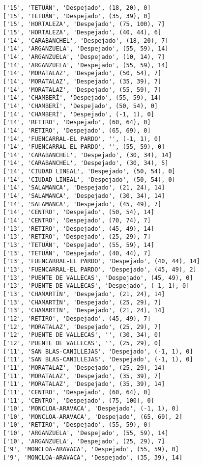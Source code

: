 \documentclass[11pt]{article}
\begin{document}
\begin{Verbatim}[commandchars=\\\{\}]
['15', 'TETUÁN', 'Despejado', (18, 20), 0]
['15', 'TETUÁN', 'Despejado', (35, 39), 0]
['15', 'HORTALEZA', 'Despejado', (75, 100), 7]
['15', 'HORTALEZA', 'Despejado', (40, 44), 6]
['14', 'CARABANCHEL', 'Despejado', (18, 20), 7]
['14', 'ARGANZUELA', 'Despejado', (55, 59), 14]
['14', 'ARGANZUELA', 'Despejado', (10, 14), 7]
['14', 'ARGANZUELA', 'Despejado', (55, 59), 14]
['14', 'MORATALAZ', 'Despejado', (50, 54), 7]
['14', 'MORATALAZ', 'Despejado', (35, 39), 7]
['14', 'MORATALAZ', 'Despejado', (55, 59), 7]
['14', 'CHAMBERÍ', 'Despejado', (55, 59), 14]
['14', 'CHAMBERÍ', 'Despejado', (50, 54), 0]
['14', 'CHAMBERÍ', 'Despejado', (-1, 1), 0]
['14', 'RETIRO', 'Despejado', (60, 64), 0]
['14', 'RETIRO', 'Despejado', (65, 69), 0]
['14', 'FUENCARRAL-EL PARDO', '', (-1, 1), 0]
['14', 'FUENCARRAL-EL PARDO', '', (55, 59), 0]
['14', 'CARABANCHEL', 'Despejado', (30, 34), 14]
['14', 'CARABANCHEL', 'Despejado', (30, 34), 5]
['14', 'CIUDAD LINEAL', 'Despejado', (50, 54), 0]
['14', 'CIUDAD LINEAL', 'Despejado', (50, 54), 0]
['14', 'SALAMANCA', 'Despejado', (21, 24), 14]
['14', 'SALAMANCA', 'Despejado', (30, 34), 14]
['14', 'SALAMANCA', 'Despejado', (45, 49), 7]
['14', 'CENTRO', 'Despejado', (50, 54), 14]
['14', 'CENTRO', 'Despejado', (70, 74), 7]
['13', 'RETIRO', 'Despejado', (45, 49), 14]
['13', 'RETIRO', 'Despejado', (25, 29), 7]
['13', 'TETUÁN', 'Despejado', (55, 59), 14]
['13', 'TETUÁN', 'Despejado', (40, 44), 7]
['13', 'FUENCARRAL-EL PARDO', 'Despejado', (40, 44), 14]
['13', 'FUENCARRAL-EL PARDO', 'Despejado', (45, 49), 2]
['13', 'PUENTE DE VALLECAS', 'Despejado', (45, 49), 0]
['13', 'PUENTE DE VALLECAS', 'Despejado', (-1, 1), 0]
['13', 'CHAMARTÍN', 'Despejado', (21, 24), 14]
['13', 'CHAMARTÍN', 'Despejado', (25, 29), 7]
['13', 'CHAMARTÍN', 'Despejado', (21, 24), 14]
['12', 'RETIRO', 'Despejado', (45, 49), 7]
['12', 'MORATALAZ', 'Despejado', (25, 29), 7]
['12', 'PUENTE DE VALLECAS', '', (30, 34), 0]
['12', 'PUENTE DE VALLECAS', '', (25, 29), 0]
['11', 'SAN BLAS-CANILLEJAS', 'Despejado', (-1, 1), 0]
['11', 'SAN BLAS-CANILLEJAS', 'Despejado', (-1, 1), 0]
['11', 'MORATALAZ', 'Despejado', (25, 29), 14]
['11', 'MORATALAZ', 'Despejado', (35, 39), 7]
['11', 'MORATALAZ', 'Despejado', (35, 39), 14]
['11', 'CENTRO', 'Despejado', (60, 64), 0]
['11', 'CENTRO', 'Despejado', (75, 100), 0]
['10', 'MONCLOA-ARAVACA', 'Despejado', (-1, 1), 0]
['10', 'MONCLOA-ARAVACA', 'Despejado', (65, 69), 2]
['10', 'RETIRO', 'Despejado', (55, 59), 0]
['10', 'ARGANZUELA', 'Despejado', (55, 59), 14]
['10', 'ARGANZUELA', 'Despejado', (25, 29), 7]
['9', 'MONCLOA-ARAVACA', 'Despejado', (55, 59), 0]
['9', 'MONCLOA-ARAVACA', 'Despejado', (35, 39), 14]

\end{Verbatim}
\end{document}
